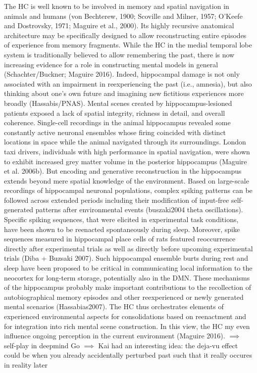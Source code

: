 \documentclass{article} %
\begin{document}
The HC is well known to be involved in memory and
spatial navigation in animals and humans
(von Bechterew, 1900; Scoville and Milner, 1957; O’Keefe and Dostrovsky, 1971; Maguire et al., 2000).
Its highly recursive anatomical architecture
may be specifically designed to allow reconstructing
entire episodes of experience from memory fragments.
%
While the HC in the medial temporal lobe system
is traditionally believed to allow remembering the past,
there is now increasing evidence for a role
in constructing mental models in general (Schachter/Buckner;
Maguire 2016).
Indeed,
hippocampal damage is
not only associated with an impairment in reexperiencing the past (i.e., amnesia),
but also thinking about one’s own future and
imagining new fictitious experiences more broadly (Hassabis/PNAS).
Mental scenes created by hippocampus-lesioned patients exposed a lack of
spatial integrity, richness in detail, and overall coherence.
%
Single-cell recordings in the animal hippocampus revealed
some constantly active neuronal ensembles whose firing coincided with
distinct locations in space while the animal navigated through its surroundings.
London taxi drivers, individuals with high performance in spatial navigation,
were shown to exhibit increased grey matter volume in the
posterior hippocampus (Maguire et al. 2006b).
But encoding and generative reconstruction in the hippocampus extends
beyond mere spatial knowledge of the environment.
Based on large-scale recordings of hippocampal neuronal populations,
complex spiking patterns can be followed across extended periods including
their modification of input-free self-generated patterns
after environmental events (buszaki2004 theta oscillations).
Specific spiking sequences, that were elicited in experimental task conditions,
have been shown to be reenacted spontaneously during sleep.
Moreover, spike sequences measured in hippocampal place cells of rats
featured reoccurrence directly after experimental trials
as well as directly before upcoming experimental trials (Diba + Buzsaki 2007).
Such hippocampal ensemble burts during rest and sleep
have been proposed to be critical in communicating local information
to the neocortex for long-term storage, potentially also in the DMN.
These mechanisms of the hippocampus probably make important contributions to the
recollection of autobiographical memory episodes and other
reexperienced or newly generated mental scenarios (Hassabias2007).
%
The HC thus orchestrates elements of experienced environmental aspects for
consolidations based on reenactment and for integration into 
rich mental scene construction. In this view, the HC my even influence
ongoing perception in the current environment (Maguire 2016).
$\implies$ self-play in deepmind Go
$\implies$ Kai had an interesting idea: the deja-vu effect could be when you already accidentally perturbed past such that it really occures in reality later
\end{document}
